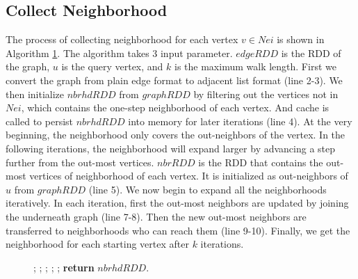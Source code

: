 \documentclass[conference]{IEEEtran}
\theoremstyle{definition}
\theoremstyle{definition}
\begin{document}
\subsection{Collect Neighborhood}
The process of collecting neighborhood for each vertex $v\in Nei$ is shown in Algorithm \ref{alg:three}.
The algorithm takes 3 input parameter.
 $edgeRDD$ is the RDD of the graph, $u$ is the query vertex, and $k$ is the maximum walk length.
First we convert the graph from plain edge format to adjacent list format (line 2-3).
We then initialize $nbrhdRDD$ from $graphRDD$  by filtering out the vertices not in $Nei$, which contains the one-step neighborhood of each vertex.
 And {\asciifamily cache} is called to persist $nbrhdRDD$ into memory for later iterations (line 4).
At the very beginning, the neighborhood only covers the out-neighbors of the vertex.
In the following iterations, the neighborhood will expand larger by advancing a step further from the out-most vertices. 
$nbrRDD$ is the RDD that contains the out-most vertices of neighborhood of each vertex. 
It is initialized as out-neighbors of $u$ from $graphRDD$ (line 5).
We now begin to expand all the neighborhoods iteratively.
In each iteration, first the out-most neighbors are updated by joining the underneath graph (line 7-8).
Then the new out-most neighbors are transferred to neighborhoods who can reach them (line 9-10).
Finally, we get the neighborhood for each starting vertex after $k$ iterations.

\begin{figure}
\begin{algorithm}[H]
\label{alg:three}
\begin{algorithmic}[1]
		;
		;
		;
			;
			;
		\EndFor
	\State \textbf{return} $nbrhdRDD$.
	\EndProcedure
\end{algorithmic}
\end{algorithm}
\end{figure}
\end{document}
